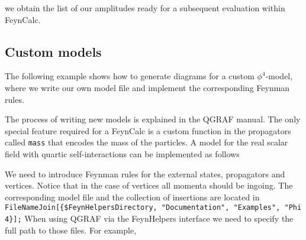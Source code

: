 \documentclass[../FeynHelpersManual.tex]{subfiles}
\begin{document}
we obtain the list of our amplitudes ready for a subsequent evaluation
within FeynCalc.

\hypertarget{custom-models}{%
\subsection{Custom models}\label{custom-models}}

The following example shows how to generate diagrams for a custom
\(\phi^4\)-model, where we write our own model file and implement the
corresponding Feynman rules.

The process of writing new models is explained in the QGRAF manual. The
only special feature required for a FeynCalc is a custom function in the
propagators called \texttt{mass} that encodes the mass of the particles.
A model for the real scalar field with quartic self-interactions can be
implemented as follows

\begin{Shaded}
\begin{Highlighting}[]
\OperatorTok{[}\ExtensionTok{=}\SpecialCharTok{\^{}}\NormalTok{\textquotesingle{} }\OperatorTok{]}

\SpecialCharTok{\%}
\OperatorTok{[}\OperatorTok{,}\OperatorTok{,} \SpecialCharTok{+}\ExtensionTok{=}\OperatorTok{]}

\SpecialCharTok{\%}
\OperatorTok{[}\OperatorTok{,}\OperatorTok{,}\OperatorTok{,}\OperatorTok{]}
\end{Highlighting}
\end{Shaded}

We need to introduce Feynman rules for the external states, propagators
and vertices. Notice that in the case of vertices all momenta should be
ingoing. The corresponding model file and the collection of insertions
are located in
\texttt{FileNameJoin[\allowbreak{}\{\allowbreak{}\$FeynHelpersDirectory,\ \allowbreak{}"Documentation",\ \allowbreak{}"Examples",\ \allowbreak{}"Phi4\}];}
When using QGRAF via the FeynHelpers interface we need to specify the
full path to those files. For example,
\end{document}

